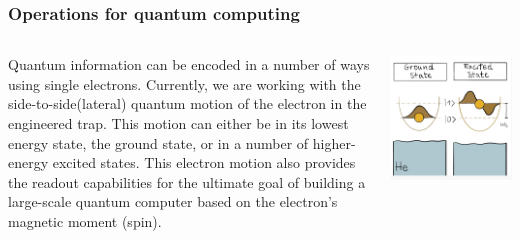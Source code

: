 \documentclass{beamer}
\begin{document}
\frame
    {
      \frametitle{Operations for quantum computing}
	
      \begin{footnotesize}
     \begin{columns}
       \column{5.0cm}
Quantum information can be encoded in a number of ways using single electrons. Currently, we are working with the side-to-side(lateral) quantum motion of the electron in the engineered trap. This motion can either be in its lowest energy state, the ground state, or in a number of higher-energy excited states. This electron motion also provides the readout capabilities for the ultimate goal of building a large-scale quantum computer based on the electron's magnetic moment (spin).       
\column{5cm}
      \begin{center}
	\includegraphics[width=1.2\textwidth]{qcfigures/nordicquantumfig4.png}
      \end{center}
\end{columns}
      \end{footnotesize}
    }
    
\end{document}
